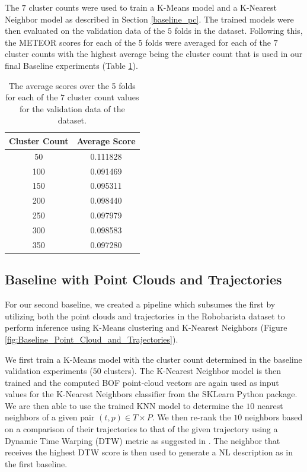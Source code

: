 \documentclass[letterpaper, 12 pt, conference]{ieeeconf}
\begin{document}
The $7$ cluster counts were used to train a K-Means model and a K-Nearest Neighbor model as described in Section \ref{baseline_pc}. The trained models were then evaluated on the validation data of the $5$ folds in the dataset. Following this, the METEOR scores for each of the $5$ folds were averaged for each of the $7$ cluster counts with the highest average being the cluster count that is used in our final Baseline experiments (Table \ref{baseline_validation_table}).

\begin{table}
\center
\begin{tabular}{|c|c|}
\hline
\textbf{Cluster Count} & \textbf{Average Score} \\
\hline
50 & 0.111828 \\
\hline
100 & 0.091469 \\
\hline
150 & 0.095311 \\
\hline
200 & 0.098440 \\
\hline
250 & 0.097979 \\
\hline
300 & 0.098583 \\
\hline
350 & 0.097280 \\
\hline
\end{tabular}
\caption{The average scores over the 5 folds for each of the $7$ cluster count values for the validation data of the dataset.}\label{baseline_validation_table}
\end{table}

\subsection{Baseline with Point Clouds and Trajectories}

For our second baseline, we created a pipeline which subsumes the first by utilizing both the point clouds and trajectories in the Robobarista dataset to perform inference using K-Means clustering and K-Nearest Neighbors (Figure \ref{fig:Baseline_Point_Cloud_and_Trajectories}). 

We first train a K-Means model with the cluster count determined in the baseline validation experiments ($50$ clusters). The K-Nearest Neighbor model is then trained and the computed BOF point-cloud vectors are again used as input values for the K-Nearest Neighbors classifier from the SKLearn Python package. We are then able to use the trained KNN model to determine the $10$ nearest neighbors of a given pair $(t,p)\in T\times P$. We then re-rank the $10$ neighbors based on a comparison of their trajectories to that of the given trajectory using a Dynamic Time Warping (DTW) metric as suggested in \cite{chen2013dynamic}. The neighbor that receives the highest DTW score is then used to generate a NL description as in the first baseline.
\end{document}
